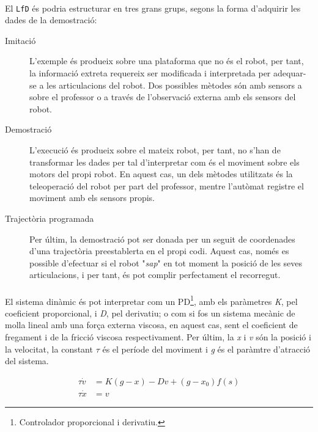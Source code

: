 \documentclass[12pt,a4paper,final,twoside]{article}
\begin{document}
\paragraph{}El \texttt{LfD} és podria estructurar en tres grans grups, segons la forma d'adquirir les dades de la demostració:
\begin{description}

\item[Imitació] L'exemple és produeix sobre una plataforma que no és el robot, per tant, la informació extreta requereix ser modificada i interpretada per adequar-se a les articulacions del robot. Dos possibles mètodes són amb sensors a sobre el professor o a través de l'observació externa amb els sensors del robot.

\item[Demostració] L'execució és produeix sobre el mateix robot, per tant, no s'han de transformar les dades per tal d'interpretar com és el moviment sobre els motors del propi robot. En aquest cas, un dels mètodes utilitzats és la teleoperació del robot per part del professor, mentre l'autòmat registre el moviment amb els sensors propis.

\item[Trajectòria programada] Per últim, la demostració pot ser donada per un seguit de coordenades d'una trajectòria preestablerta en el propi codi. Aquest cas, només es possible d'efectuar si el robot "\textit{sap}" en tot moment la posició de les seves articulacions, i per tant, és pot complir perfectament el recorregut. 

\end{description}

\paragraph{}El sistema dinàmic és pot interpretar com un PD\footnote{Controlador proporcional i derivatiu.}, amb els paràmetres \textit{K}, pel coeficient proporcional, i \textit{D}, pel derivatiu; o com si fos un sistema mecànic de molla lineal amb una força externa viscosa, en aquest cas, sent el coeficient de fregament i de la fricció viscosa respectivament. Per últim, la \textit{x} i \textit{v} són la posició i la velocitat, la constant $\tau$ és el període del moviment i \textit{g} és el paràmtre d'atracció del sistema.

\begin{align}
\tau \dot{v} &= K(g - x) - Dv + (g - x_0)f(s)\label{eq:tau-v-dot-DMP}\\
\tau \dot{x} &= v\label{eq:tau-x-dot=v}
\end{align}
\end{document}
